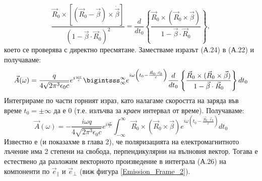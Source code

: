 \begin{appendices}
\begin{equation}
	\frac{\vec{R}_0 \times \left[\left(\vec{R}_0 - \vec{\beta}\right)\times\dot{\vec{\beta}}\right]}{(1 - \vec{\beta}\cdot\vec{R}_0)^2} = \frac{d}{dt_0}\left\{\frac{\vec{R}_0\times(\vec{R}_0\times\vec{\beta})}{1 - \vec{\beta}\cdot\vec{R}_0}\right\},
\end{equation}
което се проверява с директно пресмятане. Заместваме изразът (А.24) в (А.22) и получаваме:
\begin{eqnarray}
	\vec{A}(\omega) = \frac{q}{4\sqrt{2\pi^3\epsilon_0 c}}e^{i\frac{\omega r}{c}}\bigintsss_\infty^\infty e^{i\omega\left(t_0 - \frac{\vec{R}_0\cdot\vec{r}_0}{c}\right)}\frac{d}{dt_0}\left\{\frac{\vec{R}_0\times(\vec{R}_0\times\vec{\beta})}{1 - \vec{\beta}\cdot\vec{R}_0}\right\}dt_0
\end{eqnarray}
Интегрираме по части горният израз, като налагаме скоростта на заряда във време $t_0 = \pm\infty$ да е 0 (т.е. излъчва за \emph{краен} интервал от време). Получаваме:
\begin{equation}
	\vec{A}(\omega) = -\frac{i\omega q}{4\sqrt{2\pi^3\epsilon_0 c}}e^{i\frac{\omega r}{c}}\int_{-\infty}^\infty\vec{R}_0\times(\vec{R}_0\times\vec{\beta})e^{i\omega\left(t_0 - \frac{\vec{R}_0\cdot\vec{r}_0}{c}\right)} dt_0
\end{equation}
Известно е (и показахме в глава 2), че поляризацията на електромагнитното лъчение има 2 степени на свобода, перпендикулярни на вълновия вектор. Тогава е естествено да разложим векторното произведение в интеграла (А.26) на компоненти по $\vec{e}_{\parallel}$ и $\vec{e}_{\perp}$ (виж фигура \ref{Emission_Frame_2}).
\begin{minipage}{15em}
	
\end{minipage}
\end{appendices}
